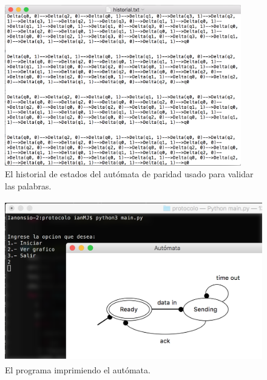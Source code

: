 \documentclass[12pt]{article}
\begin{document}
\begin{figure}[H]
\includegraphics[width=\textwidth, height=7cm]{protocolo_historial}
\caption{El historial de estados del autómata de paridad usado para validar las palabras.}
\label{fig:automata_protocolo_historial}
\end{figure}

\begin{figure}[H]
\includegraphics[width=\textwidth, height=7cm]{automata_protocolo_prueba}
\caption{El programa imprimiendo el autómata.}
\label{fig:automata_protocolo_prueba}
\end{figure}

\end{document}
